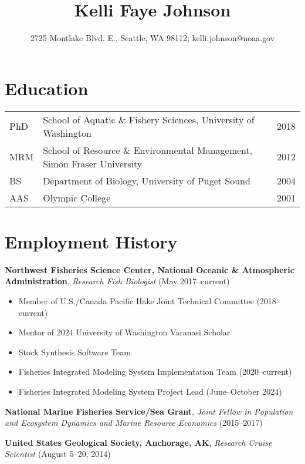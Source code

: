\documentclass[10pt]{article}
\title{\bfseries\Large Kelli Faye Johnson}
\author{2725 Montlake Blvd. E., Seattle, WA 98112; kelli.johnson@noaa.gov}
\date{}
\begin{document}

\maketitle
\vspace{-15mm}
\noindent\makebox[\linewidth]{\rule{\paperwidth}{0.4pt}}

\section*{Education}
\begin{tabular}{lll}
PhD & School of Aquatic \& Fishery Sciences, University of Washington & 2018 \\
MRM & School of Resource \& Environmental Management, Simon Fraser University & 2012 \\
BS & Department of Biology, University of Puget Sound & 2004 \\
AAS & Olympic College & 2001 \\
\end{tabular}

\section*{Employment History}

\textbf{Northwest Fisheries Science Center, National Oceanic \& Atmospheric Administration}, \textit{Research Fish Biologist} (May 2017--current)
\begin{itemize}
\vspace{-2.5mm}
  \item Member of U.S./Canada Pacific Hake Joint Technical Committee (2018--current)
  \item Mentor of 2024 University of Washington Varanasi Scholar
  \item Stock Synthesis Software Team
  \item Fisheries Integrated Modeling System Implementation Team (2020--current)
  \item Fisheries Integrated Modeling System Project Lead (June--October 2024)
\end{itemize}

\noindent \textbf{National Marine Fisheries Service/Sea Grant}, \textit{Joint Fellow in Population and Ecosystem Dynamics and Marine Resource Economics} (2015--2017)

\noindent \textbf{United States Geological Society, Anchorage, AK}, \textit{Research Cruise Scientist} (August 5--20, 2014)
\end{document}
